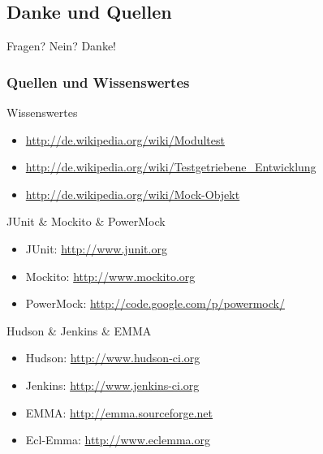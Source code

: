 \documentclass{beamer}
\begin{document}
		
		\subsection{Danke und Quellen}

			\begin{frame}
				Fragen? Nein? Danke!
			\end{frame}

			\begin{frame}
				\frametitle{Quellen und Wissenswertes}

				\scriptsize
				Wissenswertes
				\begin{itemize}
					\item{\url{http://de.wikipedia.org/wiki/Modultest}}
					\item{\url{http://de.wikipedia.org/wiki/Testgetriebene\_Entwicklung}}
					\item{\url{http://de.wikipedia.org/wiki/Mock-Objekt}}
				\end{itemize}

				JUnit \& Mockito \& PowerMock
				\begin{itemize}
					\item{JUnit: \url{http://www.junit.org}}
					\item{Mockito: \url{http://www.mockito.org}}
					\item{PowerMock: \url{http://code.google.com/p/powermock/}}
				\end{itemize}

				Hudson \& Jenkins \& EMMA
				\begin{itemize}
					\item{Hudson: \url{http://www.hudson-ci.org}}
					\item{Jenkins: \url{http://www.jenkins-ci.org}}
					\item{EMMA: \url{http://emma.sourceforge.net}}
					\item{Ecl-Emma: \url{http://www.eclemma.org}}
				\end{itemize}
			\end{frame}
\end{document}
